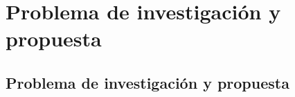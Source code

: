 \chapter*{Problema de investigación y propuesta}\label{ch:problemainvestigacion}

\section*{Problema de investigación y propuesta}
\addtocounter{section}{1}
\setcounter{subsection}{0}








